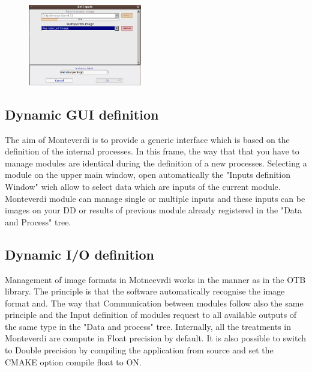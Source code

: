 \begin{figure}
   \center
   \includegraphics[width=0.44\textwidth]{../Art/MonteverdiImages/monteverdi_caching_module.png}
   \label{fig:pixeldescriptioninformations}
\end{figure}


\subsection{Dynamic GUI definition}
The aim of Monteverdi is to provide a generic interface which is based on the definition of the internal processes. 
In this frame, the way that that you have to manage modules are identical during the definition of a new processes.
Selecting a module on the upper main window, open automatically the "Inputs definition Window" wich allow to select data which
are inputs of the current module. Monteverdi module can manage single or multiple inputs and these inputs can be images on your 
DD or results of previous module already registered in the "Data and Process" tree.    
\subsection{Dynamic I/O definition}
Management of image formats in Motneevrdi works in the manner as in the OTB library.
The principle is that the software automatically recognise the image format and.
The way that
Communication between modules follow also the same principle and the Input definition of modules request to all available
outputs of the same type in the "Data and process" tree.
Internally, all the treatments in Monteverdi are compute in Float precision by default. It is also possible to switch to Double 
precision by compiling the application from source and set the CMAKE option compile float to ON.
 
